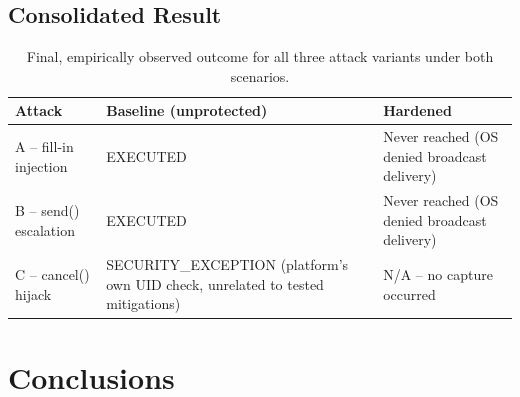 \documentclass[11pt]{article}
\begin{document}
\subsection{Consolidated Result}

\begin{table}[h]
\centering
\begin{tabular}{@{}lll@{}}
\toprule
\textbf{Attack} & \textbf{Baseline (unprotected)} & \textbf{Hardened} \\
\midrule
A -- fill-in injection & EXECUTED & Never reached (OS denied broadcast delivery) \\
B -- send() escalation & EXECUTED & Never reached (OS denied broadcast delivery) \\
C -- cancel() hijack & SECURITY\_EXCEPTION (platform's own UID check, unrelated to tested mitigations) & N/A -- no capture occurred \\
\bottomrule
\end{tabular}
\caption{Final, empirically observed outcome for all three attack variants under both scenarios.}
\end{table}

\section{Conclusions}
\end{document}
